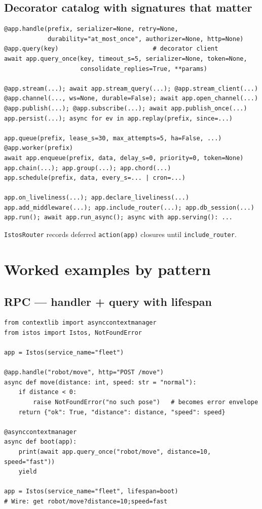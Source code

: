 \documentclass[11pt,a4paper]{article}
\begin{document}
\subsection{Decorator catalog with signatures that matter}

\begin{lstlisting}
@app.handle(prefix, serializer=None, retry=None,
            durability="at_most_once", authorizer=None, http=None)
@app.query(key)                          # decorator client
await app.query_once(key, timeout_s=5, serializer=None, token=None,
                     consolidate_replies=True, **params)

@app.stream(...); await app.stream_query(...); @app.stream_client(...)
@app.channel(..., ws=None, durable=False); await app.open_channel(...)
@app.publish(...); @app.subscribe(...); await app.publish_once(...)
app.persist(...); async for ev in app.replay(prefix, since=...)

app.queue(prefix, lease_s=30, max_attempts=5, ha=False, ...)
@app.worker(prefix)
await app.enqueue(prefix, data, delay_s=0, priority=0, token=None)
app.chain(...); app.group(...); app.chord(...)
app.schedule(prefix, data, every_s=... | cron=...)

app.on_liveliness(...); app.declare_liveliness(...)
app.add_middleware(...); app.include_router(...); app.db_session(...)
app.run(); await app.run_async(); async with app.serving(): ...
\end{lstlisting}

\texttt{IstosRouter} records deferred \texttt{action(app)} closures until
\texttt{include\_router}.

\section{Worked examples by pattern}

\subsection{RPC --- handler + query with lifespan}

\begin{lstlisting}
from contextlib import asynccontextmanager
from istos import Istos, NotFoundError

app = Istos(service_name="fleet")

@app.handle("robot/move", http="POST /move")
async def move(distance: int, speed: str = "normal"):
    if distance < 0:
        raise NotFoundError("no such pose")   # becomes error envelope
    return {"ok": True, "distance": distance, "speed": speed}

@asynccontextmanager
async def boot(app):
    print(await app.query_once("robot/move", distance=10, speed="fast"))
    yield

app = Istos(service_name="fleet", lifespan=boot)
# Wire: get robot/move?distance=10;speed=fast
\end{lstlisting}
\end{document}
